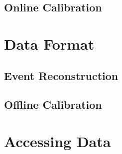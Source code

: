 \subsection{Online Calibration}

\section{Data Format}

\subsection{Event Reconstruction} \label{sec:event-reco}

\subsection{Offline Calibration}

\section{Accessing Data}
